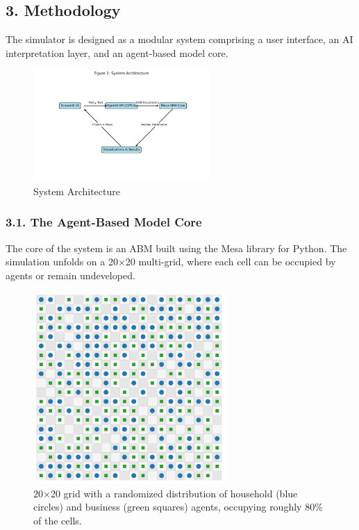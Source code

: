 \documentclass[
]{article}
\begin{document}
\subsection{3. Methodology}\label{methodology}

The simulator is designed as a modular system comprising a user
interface, an AI interpretation layer, and an agent-based model core.

\begin{figure}[h!]
  \centering
  \includegraphics[width=0.6\textwidth]{figure1_architecture.png}
  \caption{System Architecture}
  \label{fig:architecture}
\end{figure}

\subsubsection{3.1. The Agent-Based Model
Core}\label{the-agent-based-model-core}

The core of the system is an ABM built using the Mesa library for
Python. The simulation unfolds on a 20×20 multi-grid, where each cell
can be occupied by agents or remain undeveloped.

\begin{figure}[h!]
  \centering
  \includegraphics[width=0.65\textwidth]{figure4_abm_grid_random.png}
  \caption{20×20 grid with a randomized distribution of household (blue circles) and business (green squares) agents, occupying roughly 80\% of the cells.}
  \label{fig:abm_grid}
\end{figure}
\end{document}
